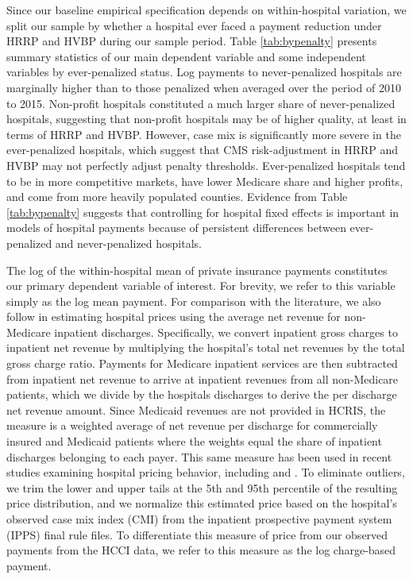 \documentclass[12pt]{article}
\begin{document}
Since our baseline empirical specification depends on within-hospital variation, we split our sample by whether a hospital ever faced a payment reduction under HRRP and HVBP during our sample period.  Table \ref{tab:bypenalty} presents summary statistics of our main dependent variable and some independent variables by ever-penalized status.  Log payments to never-penalized hospitals are marginally higher than to those penalized when averaged over the period of 2010 to 2015.  Non-profit hospitals constituted a much larger share of never-penalized hospitals, suggesting that non-profit hospitals may be of higher quality, at least in terms of HRRP and HVBP.  However, case mix is significantly more severe in the ever-penalized hospitals, which suggest that CMS risk-adjustment in HRRP and HVBP may not perfectly adjust penalty thresholds.  Ever-penalized hospitals tend to be in more competitive markets, have lower Medicare share and higher profits, and come from more heavily populated counties.  Evidence from Table \ref{tab:bypenalty} suggests that controlling for hospital fixed effects is important in models of hospital payments because of persistent differences between ever-penalized and never-penalized hospitals.

The log of the within-hospital mean of private insurance payments constitutes our primary dependent variable of interest. For brevity, we refer to this variable simply as the log mean payment. For comparison with the literature, we also follow \cite{dafny2009} in estimating hospital prices using the average net revenue for non-Medicare inpatient discharges. Specifically, we convert inpatient gross charges to inpatient net revenue by multiplying the hospital's total net revenues by the total gross charge ratio. Payments for Medicare inpatient services are then subtracted from inpatient net revenue to arrive at inpatient revenues from all non-Medicare patients, which we divide by the hospitals discharges to derive the per discharge net revenue amount. Since Medicaid revenues are not provided in HCRIS, the measure is a weighted average of net revenue per discharge for commercially insured and Medicaid patients where the weights equal the share of inpatient discharges belonging to each payer. This same measure has been used in recent studies examining hospital pricing behavior, including \cite{schmitt2017} and \cite{lewis2015}. To eliminate outliers, we trim the lower and upper tails at the 5th and 95th percentile of the resulting price distribution, and we normalize this estimated price based on the hospital's observed case mix index (CMI) from the inpatient prospective payment system (IPPS) final rule files. To differentiate this measure of price from our observed payments from the HCCI data, we refer to this measure as the log charge-based payment.
\end{document}
